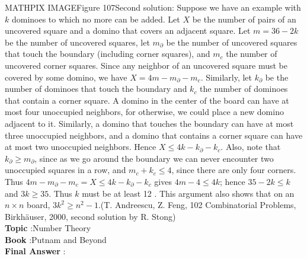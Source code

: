 \documentclass[10pt]{article}
\begin{document}
MATHPIX IMAGEFigure 107Second solution: Suppose we have an example with $k$ dominoes to which no more can be added. Let $X$ be the number of pairs of an uncovered square and a domino that covers an adjacent square. Let $m=36-2 k$ be the number of uncovered squares, let $m_{\partial}$ be the number of uncovered squares that touch the boundary (including corner squares), and $m_{c}$ the number of uncovered corner squares. Since any neighbor of an uncovered square must be covered by some domino, we have $X=4 m-m_{\partial}-m_{c}$. Similarly, let $k_{\partial}$ be the number of dominoes that touch the boundary and $k_{c}$ the number of dominoes that contain a corner square. A domino in the center of the board can have at most four unoccupied neighbors, for otherwise, we could place a new domino adjacent to it. Similarly, a domino that touches the boundary can have at most three unoccupied neighbors, and a domino that contains a corner square can have at most two unoccupied neighbors. Hence $X \leq 4 k-k_{\partial}-k_{c}$. Also, note that $k_{\partial} \geq m_{\partial}$, since as we go around the boundary we can never encounter two unoccupied squares in a row, and $m_{c}+k_{c} \leq 4$, since there are only four corners. Thus $4 m-m_{\partial}-m_{c}=X \leq 4 k-k_{\partial}-k_{c}$ gives $4 m-4 \leq 4 k$; hence $35-2 k \leq k$ and $3 k \geq 35$. Thus $k$ must be at least 12 . This argument also shows that on an $n \times n$ board, $3 k^{2} \geq n^{2}-1$.(T. Andreescu, Z. Feng, 102 Combinatorial Problems, Birkhäuser, 2000, second solution by R. Stong)\\
\textbf{Topic} :Number Theory\\
\textbf{Book} :Putnam and Beyond\\
\textbf{Final Answer} :\\
\end{document}
